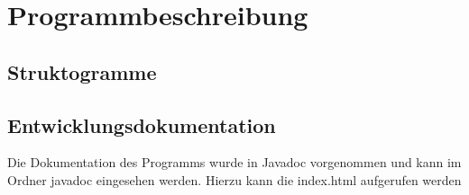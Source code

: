 \chapter{Programmbeschreibung}\label{ch:programmbeschreibung}

\section{Struktogramme}\label{sec:structogram}
\begin{center}
    \makebox[\textwidth]{}
\end{center}

\section{Entwicklungsdokumentation}\label{sec:entwicklerdokumentation}
Die Dokumentation des Programms wurde in Javadoc vorgenommen und kann im Ordner javadoc eingesehen werden.
Hierzu kann die index.html aufgerufen werden